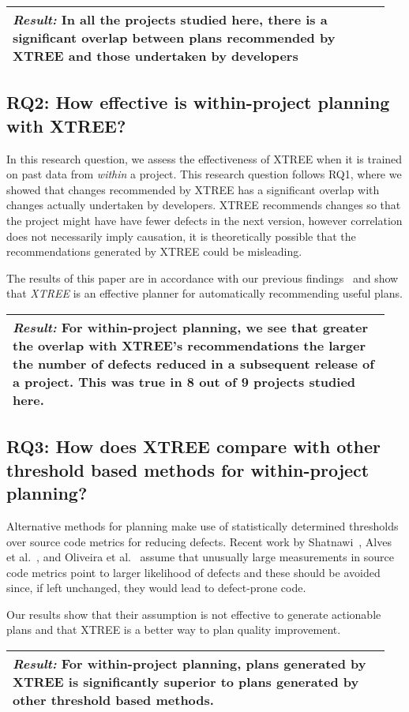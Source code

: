 \documentclass[10pt,journal,compsoc]{IEEEtran}
\newcommand{\result}[1]{
\vspace{0.2cm}
\noindent\begin{minipage}{\linewidth}
    \begin{tabular}{|p{0.95\linewidth}|}
    	\arrayrulecolor{Gray}
    	\hline\vspace{-0.2cm}
    	\rowcolor{Gray} \textit{\textbf{Result:}} #1\\\hline
    \end{tabular}
\end{minipage}\bigstrut%
}
\begin{document}
\result{In all the projects studied here, there is a significant overlap between plans recommended by XTREE and those undertaken by developers}

\subsection*{RQ2: How effective is within-project planning with XTREE?}

In this research question, we assess the effectiveness of XTREE when it is trained on past data from \textit{within} a project. This research question follows RQ1, where we showed that changes recommended by XTREE has a significant overlap with changes actually undertaken by developers. XTREE recommends changes so that the project might have have fewer defects in the next version, however correlation does not necessarily imply causation, it is theoretically possible that the recommendations generated by XTREE could be misleading. 

The  results of this paper are in accordance with our previous findings~\cite{krishna17a} and show that {\em XTREE} is an effective planner for automatically recommending useful plans.

\result{For within-project planning, we see that greater the overlap with XTREE's recommendations the larger the number of defects reduced in a subsequent release of a project. This was true in 8 out of 9 projects studied here.}

     
\subsection*{RQ3: How does XTREE compare with other threshold based methods for within-project planning?}
    
Alternative methods for planning make use of statistically determined thresholds over source code metrics for reducing defects. Recent work by Shatnawi~\cite{shatnawi}, Alves et al.~\cite{alves}, and Oliveira et al.~\cite{oliveira} assume that unusually large measurements in source code metrics point to larger likelihood of defects and these should be avoided since, if left unchanged, they would lead to defect-prone code.  

Our results show  that their assumption is not effective to generate actionable plans  and that XTREE is a better way to plan quality improvement.

\result{For within-project planning, plans generated by XTREE is significantly superior to plans generated by other threshold based methods.}
\end{document}
